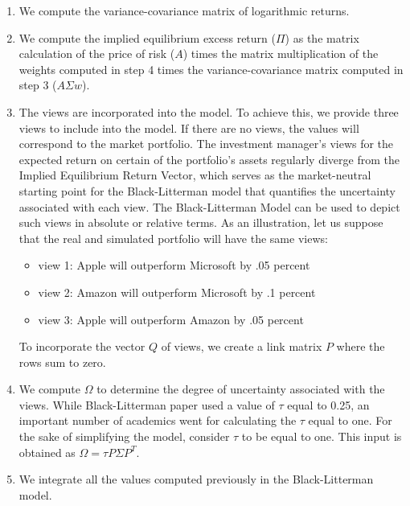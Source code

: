 \begin{enumerate}
\item We compute the variance-covariance matrix of logarithmic returns.
\item We compute the implied equilibrium excess return ($\Pi$) as the matrix calculation of the price of risk ($A$) times the matrix multiplication of the weights computed in step 4 times the variance-covariance matrix computed in step 3 ($A\Sigma w$).
\item  The views are incorporated into the model. To achieve this, we provide three views to include into the model. If there are no views, the values will correspond to the market portfolio. The investment manager’s views for the expected return on certain of the portfolio’s assets regularly diverge from the Implied Equilibrium Return Vector, which serves as the market-neutral starting point for the Black-Litterman model that quantifies the uncertainty associated with each view. The Black-Litterman Model can be used to depict such views in absolute or relative terms. As an illustration, let us suppose that the real and simulated portfolio will have the same views:
\begin{itemize}
\item view 1: Apple will outperform Microsoft by .05 percent
\item view 2: Amazon will outperform Microsoft by .1 percent
\item view 3: Apple will outperform Amazon by .05 percent
\end{itemize}
To incorporate the vector $Q$ of views, we create a link matrix $P$ where the rows sum to zero. %
\item We compute $\Omega$ to determine the degree of uncertainty associated with the views. While Black-Litterman paper used a value of $\tau$ equal to 0.25, an important number of academics went for calculating the $\tau$ equal to one. For the sake of simplifying the model, consider $\tau$ to be equal to one. This input is obtained as $\Omega = \tau P\Sigma P^T$.
\item We integrate all the values computed previously in the Black-Litterman model. %
\end{enumerate}

